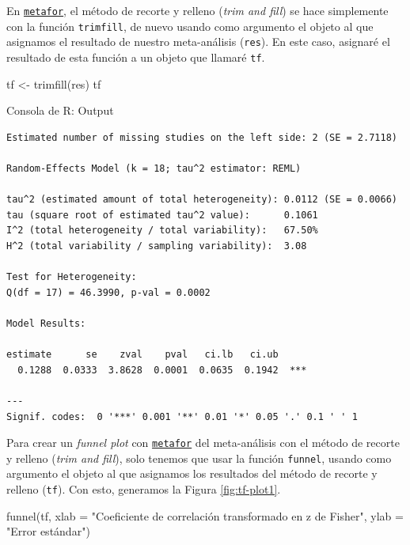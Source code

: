 \documentclass[
  bookmarksnumbered]{article}
\newenvironment{Shaded}{\begin{snugshade}}{\end{snugshade}}
\newcommand{\AttributeTok}[1]{\textcolor[rgb]{0.00,0.34,0.68}{#1}}
\newcommand{\FunctionTok}[1]{\textcolor[rgb]{0.39,0.29,0.61}{#1}}
\newcommand{\NormalTok}[1]{\textcolor[rgb]{0.12,0.11,0.11}{#1}}
\newcommand{\OtherTok}[1]{\textcolor[rgb]{0.00,0.43,0.16}{#1}}
\newcommand{\StringTok}[1]{\textcolor[rgb]{0.75,0.01,0.01}{#1}}
\begin{document}
En \href{https://www.metafor-project.org/doku.php}{\texttt{metafor}}, el método de recorte y relleno (\emph{trim and fill}) se hace simplemente con la función \texttt{trimfill}, de nuevo usando como argumento el objeto al que asignamos el resultado de nuestro meta-análisis (\texttt{res}). En este caso, asignaré el resultado de esta función a un objeto que llamaré \texttt{tf}.

\begin{Shaded}
\begin{Highlighting}[]
\NormalTok{tf }\OtherTok{\textless{}{-}} \FunctionTok{trimfill}\NormalTok{(res)}
\NormalTok{tf}
\end{Highlighting}
\end{Shaded}

\begin{ROut}{Consola de R: Output~\thetcbcounter}
                \begin{footnotesize}
                \begin{verbatim} 
Estimated number of missing studies on the left side: 2 (SE = 2.7118)

Random-Effects Model (k = 18; tau^2 estimator: REML)

tau^2 (estimated amount of total heterogeneity): 0.0112 (SE = 0.0066)
tau (square root of estimated tau^2 value):      0.1061
I^2 (total heterogeneity / total variability):   67.50%
H^2 (total variability / sampling variability):  3.08

Test for Heterogeneity:
Q(df = 17) = 46.3990, p-val = 0.0002

Model Results:

estimate      se    zval    pval   ci.lb   ci.ub      
  0.1288  0.0333  3.8628  0.0001  0.0635  0.1942  *** 

---
Signif. codes:  0 '***' 0.001 '**' 0.01 '*' 0.05 '.' 0.1 ' ' 1
 \end{verbatim}
                \end{footnotesize}
                \end{ROut}

Para crear un \emph{funnel plot} con \href{https://www.metafor-project.org/doku.php}{\texttt{metafor}} del meta-análisis con el método de recorte y relleno (\emph{trim and fill}), solo tenemos que usar la función \texttt{funnel}, usando
como argumento el objeto al que asignamos los resultados del método de recorte y relleno (\texttt{tf}). Con esto, generamos la Figura \ref{fig:tf-plot1}.

\begin{Shaded}
\begin{Highlighting}[]
\FunctionTok{funnel}\NormalTok{(tf, }
       \AttributeTok{xlab =} \StringTok{"Coeficiente de correlación transformado en z de Fisher"}\NormalTok{,}
       \AttributeTok{ylab =} \StringTok{"Error estándar"}\NormalTok{)}
\end{Highlighting}
\end{Shaded}
\end{document}
